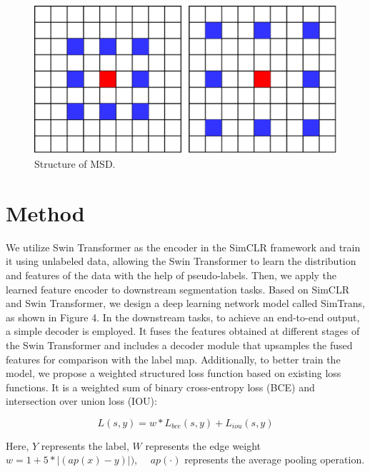 \documentclass[10pt,twocolumn,letterpaper]{article}
\begin{document}
\begin{figure}[htbp]   %
	\centering
	\includegraphics[width=\linewidth,scale=1.00]{Images/MSD.png}
	\caption{Structure of MSD.}
	\label{fig:msd}
\end{figure}


\section{Method}
\label{sec:method}

We utilize Swin Transformer as the encoder in the SimCLR framework and train it using unlabeled data, allowing the Swin Transformer to learn the distribution and features of the data with the help of pseudo-labels. Then, we apply the learned feature encoder to downstream segmentation tasks. Based on SimCLR and Swin Transformer, we design a deep learning network model called SimTrans, as shown in Figure 4. In the downstream tasks, to achieve an end-to-end output, a simple decoder is employed. It fuses the features obtained at different stages of the Swin Transformer and includes a decoder module that upsamples the fused features for comparison with the label map. Additionally, to better train the model, we propose a weighted structured loss function based on existing loss functions. It is a weighted sum of binary cross-entropy loss (BCE) and intersection over union loss (IOU):

\begin{equation}
  L(s, y)=w * L_{b c e}(s, y)+L_{i o u}(s, y)
\end{equation}

Here, $Y$ represents the label, $W$ represents the edge weight $w=1+5 *|(a p(x)-y)|)$, $\quad a p(\cdot)$ represents the average pooling operation.
\end{document}
